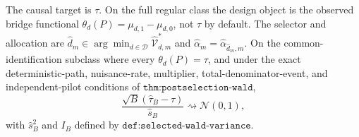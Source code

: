 The causal target is \(\tau\). On the full regular class the design object is the observed bridge functional \(\theta_d(P)=\mu_{d,1}-\mu_{d,0}\), not \(\tau\) by default. The selector and allocation are \(\widehat d_m\in\arg\min_{d\in\mathcal D}\widehat{\mathcal V}_{d,m}^*\) and \(\widehat\alpha_m=\widehat\alpha_{\widehat d_m,m}\). On the common-identification subclass where every \(\theta_d(P)=\tau\), and under the exact deterministic-path, nuisance-rate, multiplier, total-denominator-event, and independent-pilot conditions of \(\texttt{thm:postselection-wald}\),
\[
 \frac{\sqrt B(\widehat\tau_B-\tau)}{\widehat s_B}
 \rightsquigarrow\mathcal N(0,1),
\]
with \(\widehat s_B^2\) and \(I_B\) defined by \(\texttt{def:selected-wald-variance}\).